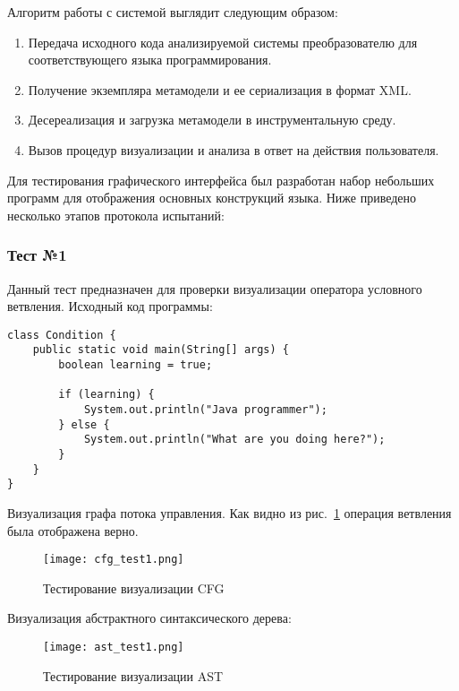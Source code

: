 Алгоритм работы с системой выглядит следующим образом:

\begin{enumerate}
    \item Передача исходного кода анализируемой системы преобразователю для
    соответствующего языка программирования.
    \item Получение экземпляра метамодели и ее сериализация в формат XML.
    \item Десереализация и загрузка метамодели в инструментальную среду.
    \item Вызов процедур визуализации и анализа в ответ на действия пользователя.
\end{enumerate}

Для тестирования графического интерфейса был разработан набор небольших программ
для отображения основных конструкций языка. Ниже приведено несколько этапов
протокола испытаний:

\subsubsection{Тест №1}

Данный тест предназначен для проверки визуализации оператора условного ветвления.
Исходный код программы:

\begin{lstlisting}[caption={Тестовая программа}]
class Condition {
    public static void main(String[] args) {
        boolean learning = true;

        if (learning) {
            System.out.println("Java programmer");
        } else {
            System.out.println("What are you doing here?");
        }
    }
}
\end{lstlisting}

Визуализация графа потока управления. Как видно из рис.~\ref{fig:cfg_test1}
операция ветвления была отображена верно.

\newpage
\begin{figure}[h]
    \begin{center}
        \texttt{[image: cfg\_test1.png]}
    \end{center}
    \caption{Тестирование визуализации CFG}
    \label{fig:cfg_test1}
\end{figure}

Визуализация абстрактного синтаксического дерева:

\begin{figure}[h]
    \begin{center}
        \texttt{[image: ast\_test1.png]}
    \end{center}
    \caption{Тестирование визуализации AST}
    \label{fig:ast_test1}
\end{figure}

